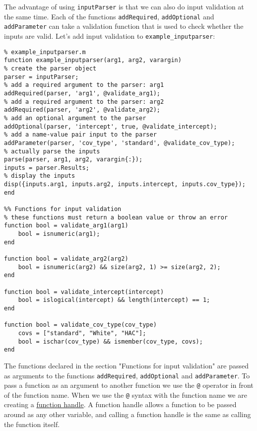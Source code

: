 \documentclass[12pt, a4paper]{article}
\begin{document}
The advantage of using \texttt{inputParser} is that we can also do input validation at the same time. Each of the functions \texttt{addRequired}, \texttt{addOptional} and \texttt{addParameter} can take a validation function that is used to check whether the inputs are valid.
Let's add input validation to \texttt{example\_inputparser}:
\lstset{language=matlab,label= ,caption= ,captionpos=b,firstnumber=1,numbers=left,style=Matlab-editor}
\begin{lstlisting}
% example_inputparser.m
function example_inputparser(arg1, arg2, varargin)
% create the parser object
parser = inputParser;
% add a required argument to the parser: arg1
addRequired(parser, 'arg1', @validate_arg1);
% add a required argument to the parser: arg2
addRequired(parser, 'arg2', @validate_arg2);
% add an optional argument to the parser
addOptional(parser, 'intercept', true, @validate_intercept);
% add a name-value pair input to the parser
addParameter(parser, 'cov_type', 'standard', @validate_cov_type);
% actually parse the inputs
parse(parser, arg1, arg2, varargin{:});
inputs = parser.Results;
% display the inputs
disp({inputs.arg1, inputs.arg2, inputs.intercept, inputs.cov_type});
end

%% Functions for input validation
% these functions must return a boolean value or throw an error
function bool = validate_arg1(arg1)
    bool = isnumeric(arg1);
end

function bool = validate_arg2(arg2)
    bool = isnumeric(arg2) && size(arg2, 1) >= size(arg2, 2);
end

function bool = validate_intercept(intercept)
    bool = islogical(intercept) && length(intercept) == 1;
end

function bool = validate_cov_type(cov_type)
    covs = ["standard", "White", "HAC"];
    bool = ischar(cov_type) && ismember(cov_type, covs);
end
\end{lstlisting}
The functions declared in the section "Functions for input validation" are passed as arguments to the functions \texttt{addRequired}, \texttt{addOptional} and \texttt{addParameter}.
To pass a function as an argument to another function we use the \texttt{@} operator in front of the function name.
When we use the \texttt{@} syntax with the function name we are creating a \href{https://www.mathworks.com/help/matlab/matlab\_prog/creating-a-function-handle.html}{function handle}.
A function handle allows a function to be passed around as any other variable, and calling a function handle is the same as calling the function itself.
\end{document}
